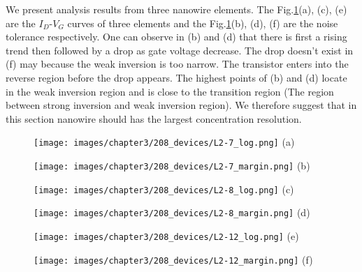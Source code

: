 We present analysis results from three nanowire elements.
The Fig.\ref{fig:SD_Device}(a), (c), (e) are the $I_D$-$V_G$ curves of three elements and the Fig.\ref{fig:SD_Device}(b), (d), (f) are the noise tolerance respectively.
One can observe in (b) and (d) that there is first a rising trend then followed by a drop as gate voltage decrease.
The drop doesn't exist in (f) may because the weak inversion is too narrow.
The transistor enters into the reverse region before the drop appears.
The highest points of (b) and (d) locate in the weak inversion region and is close to the transition region (The region between strong inversion and weak inversion region).
We therefore suggest that in this section nanowire should has the largest concentration resolution.



\begin{figure}[h!]
    \centering
    \begin{minipage}[t][20cm][t]{1\textwidth}
        \begin{minipage}[t]{0.3\textwidth}
            \centering
            \texttt{[image: images/chapter3/208\_devices/L2-7\_log.png]}
            (a)
        \end{minipage}
        \hfill
        \begin{minipage}[t]{0.3\textwidth}
            \centering
            \texttt{[image: images/chapter3/208\_devices/L2-7\_margin.png]}
            (b)
        \end{minipage}
        \vfill
        \begin{minipage}[t]{0.3\textwidth}
            \centering
            \texttt{[image: images/chapter3/208\_devices/L2-8\_log.png]}
            (c)
        \end{minipage}
        \hfill
        \begin{minipage}[t]{0.3\textwidth}
            \centering
            \texttt{[image: images/chapter3/208\_devices/L2-8\_margin.png]}
            (d)
        \end{minipage}
        \vfill
        \begin{minipage}[t]{0.3\textwidth}
            \centering
            \texttt{[image: images/chapter3/208\_devices/L2-12\_log.png]}
            (e)
        \end{minipage}
        \hfill
        \begin{minipage}[t]{0.3\textwidth}
            \centering
            \texttt{[image: images/chapter3/208\_devices/L2-12\_margin.png]}
            (f)
        \end{minipage}

    \end{minipage}
    \caption{}
    \label{fig:SD_Device}
\end{figure}
\FloatBarrier

